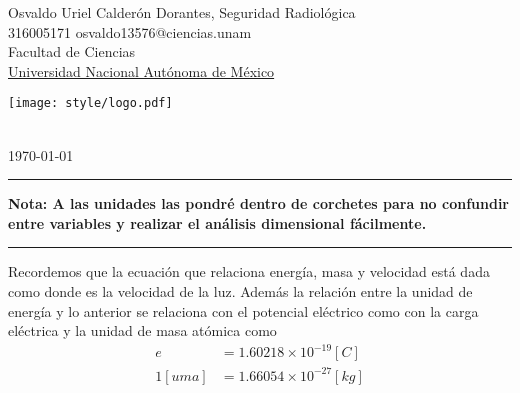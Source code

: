 

\pagestyle{fancy}
\fancyhf{}
\makeatletter
\def\@seccntformat#1{%
  \expandafter\ifx\csname c@#1\endcsname\c@section\else
  \csname the#1\endcsname\quad
  \fi}
\makeatother

\begin{flushleft}
Osvaldo Uriel Calderón Dorantes, \hfill Seguridad Radiológica\\
316005171 \hfill osvaldo13576@ciencias.unam  \\
Facultad de Ciencias\\
\underline{Universidad Nacional Autónoma de México}
\end{flushleft}

\begin{flushright}\vspace{-5mm}
\texttt{[image: style/logo.pdf]}
\end{flushright}
 
\begin{center}\vspace{-1cm}
\textbf{ \large {}}\\
\today
\end{center}
\medskip\hrule\medskip
{\small \textbf{Nota: A las unidades las pondré dentro de corchetes  para no confundir entre variables y realizar el análisis dimensional fácilmente.}}
\medskip\hrule\bigskip

\newlength{\strutheight}
\settoheight{\strutheight}{\strut}


Recordemos que la ecuación que relaciona energía, masa y velocidad está dada como
donde  es la velocidad de la luz. Además la relación entre la unidad de energía 
y lo anterior se relaciona con el potencial eléctrico como
con la carga eléctrica y la unidad de masa atómica como 
\begin{align}
  e&=1.60218\times10^{-19}[C]\label{e:e}\\
  1[uma]&=1.66054\times10^{-27}[kg]\label{e:uma}
\end{align}


